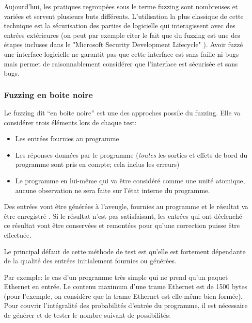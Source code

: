 \documentclass[a4paper]{report}
\begin{document}
Aujourd’hui, les pratiques regroupées sous le terme fuzzing sont nombreuses et variées et servent plusieurs buts différents.
L'utilisation la plus classique  de cette technique est la sécurisation des parties de logicielle qui interagissent avec des entrées extérieures \cite{Godefroid2020} (on peut par exemple citer le fait que du fuzzing est une des étapes incluses dans le "Microsoft Security Development Lifecycle" \cite{howard2006security} ).
Avoir fuzzé une interface logicielle ne garantit pas que cette interface est sans faille ni bugs mais permet de raisonnablement considérer que l'interface est sécurisée et sans bugs\cite{Godefroid2020}.



\subsubsection{Fuzzing en boite noire}

Le fuzzing dit “en boite noire” est une des approches possile du fuzzing.
Elle va considérer trois éléments lors de chaque test:
\begin{itemize}
\item Les entrées fournies au programme
\item Les réponses données par le programme (\textit{toutes} les sorties et effets de bord du programme sont pris en compte; cela inclus les erreurs)
\item Le programme en lui-même qui va être considéré comme une unité atomique, aucune observation ne sera faite sur l'état interne du programme.
\end{itemize}
Des entrées vont être générées à l'aveugle, fournies au programme et le résultat va être enregistré \cite{Forrester2000}.
Si le résultat n'est pas satisfaisant, les entrées qui ont déclenché ce résultat vont être conservées et remontées pour qu'une correction puisse être effectuée.

Le principal  défaut de cette méthode de test est qu'elle est fortement dépendante de la qualité des entrées initialement fournies ou générées. 

Par exemple: le cas d'un programme très simple qui ne prend qu'un paquet Ethernet en entrée.
Le contenu maximum d'une trame Ethernet est de 1500 bytes (pour l'exemple, on considère que la trame Ethernet est elle-même bien formée).
Pour couvrir l'intégralité des probabilités d'entrée du programme, il est nécessaire de générer et de tester le nombre suivant de possibilités:
\end{document}
